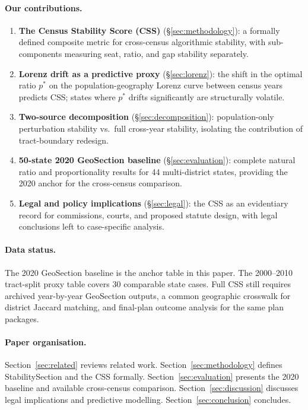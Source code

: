 \paragraph{Our contributions.}
\begin{enumerate}
\item \textbf{The Census Stability Score (CSS)} (\S\ref{sec:methodology}):
  a formally defined composite metric for cross-census algorithmic stability,
  with sub-components measuring seat, ratio, and gap stability separately.

\item \textbf{Lorenz drift as a predictive proxy} (\S\ref{sec:lorenz}):
  the shift in the optimal ratio $p^*$ on the population-geography Lorenz
  curve between census years predicts CSS; states where $p^*$ drifts
  significantly are structurally volatile.

\item \textbf{Two-source decomposition} (\S\ref{sec:decomposition}):
  population-only perturbation stability vs.\ full cross-year stability,
  isolating the contribution of tract-boundary redesign.

\item \textbf{50-state 2020 GeoSection baseline} (\S\ref{sec:evaluation}):
  complete natural ratio and proportionality results for 44 multi-district
  states, providing the 2020 anchor for the cross-census comparison.

\item \textbf{Legal and policy implications} (\S\ref{sec:legal}):
  the CSS as an evidentiary record for commissions, courts, and proposed
  statute design, with legal conclusions left to case-specific analysis.
\end{enumerate}

\paragraph{Data status.}
The 2020 GeoSection baseline is the anchor table in this paper.
The 2000--2010 tract-split proxy table covers 30 comparable state cases.
Full CSS still requires archived year-by-year GeoSection outputs, a common
geographic crosswalk for district Jaccard matching, and final-plan outcome
analysis for the same plan packages.

\paragraph{Paper organisation.}
Section~\ref{sec:related} reviews related work.
Section~\ref{sec:methodology} defines StabilitySection and the CSS formally.
Section~\ref{sec:evaluation} presents the 2020 baseline and available
cross-census comparison.
Section~\ref{sec:discussion} discusses legal implications and predictive
modelling.
Section~\ref{sec:conclusion} concludes.
